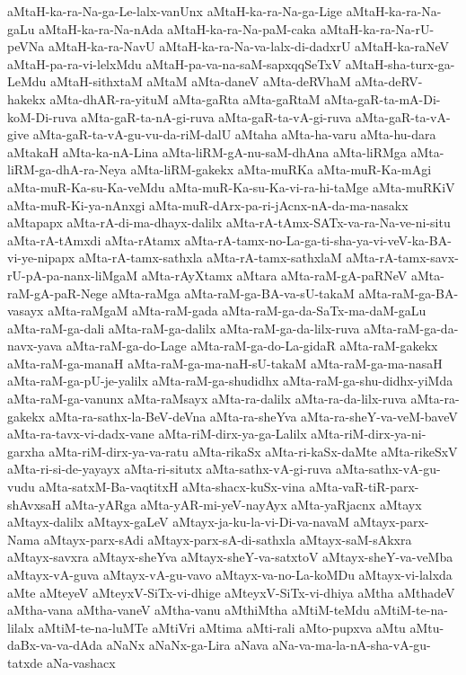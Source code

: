 {aMtaH-ka-ra-Na-ga-Le-lalx-vanUnx
aMtaH-ka-ra-Na-ga-Lige
aMtaH-ka-ra-Na-gaLu
aMtaH-ka-ra-Na-nAda
aMtaH-ka-ra-Na-paM-caka
aMtaH-ka-ra-Na-rU-peVNa
aMtaH-ka-ra-NavU
aMtaH-ka-ra-Na-va-lalx-di-dadxrU
aMtaH-ka-raNeV
aMtaH-pa-ra-vi-lelxMdu
aMtaH-pa-va-na-saM-sapxqqSeTxV
aMtaH-sha-turx-ga-LeMdu
aMtaH-sithxtaM
aMtaM
aMta-daneV
aMta-deRVhaM
aMta-deRV-hakekx
aMta-dhAR-ra-yituM
aMta-gaRta
aMta-gaRtaM
aMta-gaR-ta-mA-Di-koM-Di-ruva
aMta-gaR-ta-nA-gi-ruva
aMta-gaR-ta-vA-gi-ruva
aMta-gaR-ta-vA-give
aMta-gaR-ta-vA-gu-vu-da-riM-dalU
aMtaha
aMta-ha-varu
aMta-hu-dara
aMtakaH
aMta-ka-nA-Lina
aMta-liRM-gA-nu-saM-dhAna
aMta-liRMga
aMta-liRM-ga-dhA-ra-Neya
aMta-liRM-gakekx
aMta-muRKa
aMta-muR-Ka-mAgi
aMta-muR-Ka-su-Ka-veMdu
aMta-muR-Ka-su-Ka-vi-ra-hi-taMge
aMta-muRKiV
aMta-muR-Ki-ya-nAnxgi
aMta-muR-dArx-pa-ri-jAcnx-nA-da-ma-nasakx
aMtapapx
aMta-rA-di-ma-dhayx-dalilx
aMta-rA-tAmx-SATx-va-ra-Na-ve-ni-situ
aMta-rA-tAmxdi
aMta-rAtamx
aMta-rA-tamx-no-La-ga-ti-sha-ya-vi-veV-ka-BA-vi-ye-nipapx
aMta-rA-tamx-sathxla
aMta-rA-tamx-sathxlaM
aMta-rA-tamx-savx-rU-pA-pa-nanx-liMgaM
aMta-rAyXtamx
aMtara
aMta-raM-gA-paRNeV
aMta-raM-gA-paR-Nege
aMta-raMga
aMta-raM-ga-BA-va-sU-takaM
aMta-raM-ga-BA-vasayx
aMta-raMgaM
aMta-raM-gada
aMta-raM-ga-da-SaTx-ma-daM-gaLu
aMta-raM-ga-dali
aMta-raM-ga-dalilx
aMta-raM-ga-da-lilx-ruva
aMta-raM-ga-da-navx-yava
aMta-raM-ga-do-Lage
aMta-raM-ga-do-La-gidaR
aMta-raM-gakekx
aMta-raM-ga-manaH
aMta-raM-ga-ma-naH-sU-takaM
aMta-raM-ga-ma-nasaH
aMta-raM-ga-pU-je-yalilx
aMta-raM-ga-shudidhx
aMta-raM-ga-shu-didhx-yiMda
aMta-raM-ga-vanunx
aMta-raMsayx
aMta-ra-dalilx
aMta-ra-da-lilx-ruva
aMta-ra-gakekx
aMta-ra-sathx-la-BeV-deVna
aMta-ra-sheYva
aMta-ra-sheY-va-veM-baveV
aMta-ra-tavx-vi-dadx-vane
aMta-riM-dirx-ya-ga-Lalilx
aMta-riM-dirx-ya-ni-garxha
aMta-riM-dirx-ya-va-ratu
aMta-rikaSx
aMta-ri-kaSx-daMte
aMta-rikeSxV
aMta-ri-si-de-yayayx
aMta-ri-situtx
aMta-sathx-vA-gi-ruva
aMta-sathx-vA-gu-vudu
aMta-satxM-Ba-vaqtitxH
aMta-shacx-kuSx-vina
aMta-vaR-tiR-parx-shAvxsaH
aMta-yARga
aMta-yAR-mi-yeV-nayAyx
aMta-yaRjacnx
aMtayx
aMtayx-dalilx
aMtayx-gaLeV
aMtayx-ja-ku-la-vi-Di-va-navaM
aMtayx-parx-Nama
aMtayx-parx-sAdi
aMtayx-parx-sA-di-sathxla
aMtayx-saM-sAkxra
aMtayx-savxra
aMtayx-sheYva
aMtayx-sheY-va-satxtoV
aMtayx-sheY-va-veMba
aMtayx-vA-guva
aMtayx-vA-gu-vavo
aMtayx-va-no-La-koMDu
aMtayx-vi-lalxda
aMte
aMteyeV
aMteyxV-SiTx-vi-dhige
aMteyxV-SiTx-vi-dhiya
aMtha
aMthadeV
aMtha-vana
aMtha-vaneV
aMtha-vanu
aMthiMtha
aMtiM-teMdu
aMtiM-te-na-lilalx
aMtiM-te-na-luMTe
aMtiVri
aMtima
aMti-rali
aMto-pupxva
aMtu
aMtu-daBx-va-va-dAda
aNaNx
aNaNx-ga-Lira
aNava
aNa-va-ma-la-nA-sha-vA-gu-tatxde
aNa-vashacx
}
